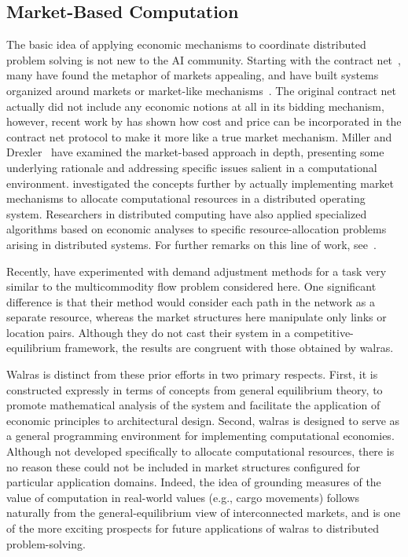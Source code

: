 \subsection{Market-Based Computation}

The basic idea of applying economic mechanisms to coordinate 
distributed problem solving is not new to the AI community.
Starting with the contract net~\cite{RDRGS83}, many have found the 
metaphor of markets appealing, and have built systems organized around 
markets or market-like mechanisms~\cite{Malone88}.  The original
contract net actually did not include any economic notions 
at all in its bidding mechanism, however, recent work by  has 
shown how cost and price can be incorporated in the contract net protocol 
to make it more like a true market mechanism.
Miller and Drexler~\cite{Drexler88,Miller-Drexler88} have examined the 
market-based approach in depth, presenting some 
underlying rationale and addressing specific issues salient in a 
computational environment.
 investigated the concepts
further by actually implementing market mechanisms to allocate
computational resources in a distributed operating system.
Researchers in distributed computing \cite{Kurose89} have also applied 
specialized algorithms based on economic analyses to specific 
resource-allocation problems arising in distributed systems.
For further remarks on this line of work, see~\cite{Wellman91fc}.

Recently,  have experimented
with demand adjustment methods for a task very similar to the
multicommodity flow problem considered here.  One significant difference 
is that their method would consider each path in the network as a 
separate resource, whereas the market structures here manipulate only 
links or location pairs.  Although they do not
cast their system in a competitive-equilibrium framework, the results are
congruent with those obtained by {\sc walras}.

{\sc Walras} is distinct from these prior efforts in two primary respects.
First, it is constructed expressly in terms of concepts from general 
equilibrium theory, to promote mathematical analysis of the system 
and facilitate the application of economic principles to architectural 
design.
Second, {\sc walras} is designed to serve as a general 
programming environment for implementing computational economies.
Although not developed specifically to allocate computational resources, 
there is no reason these could not be included in market structures 
configured for particular application domains.
Indeed, the idea of grounding measures of the value of computation in 
real-world values (e.g., cargo movements) follows naturally from the 
general-equilibrium view of interconnected markets, and is one of the 
more exciting prospects for future applications of {\sc walras} to 
distributed problem-solving.

